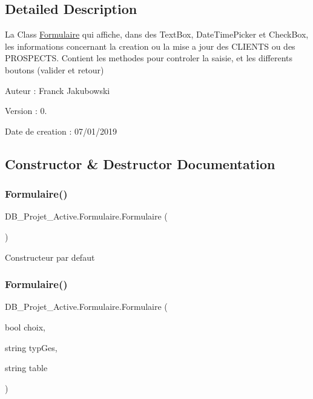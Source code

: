 \subsection{Detailed Description}
La Class \mbox{\hyperlink{class_d_b___projet___active_1_1_formulaire}{Formulaire}} qui affiche, dans des Text\+Box, Date\+Time\+Picker et Check\+Box, les informations concernant la creation ou la mise a jour des C\+L\+I\+E\+N\+TS ou des P\+R\+O\+S\+P\+E\+C\+TS. Contient les methodes pour controler la saisie, et les differents boutons (valider et retour) 

Auteur \+: Franck Jakubowski

Version \+: 0.

Date de creation \+: 07/01/2019

\subsection{Constructor \& Destructor Documentation}
\mbox{\label{class_d_b___projet___active_1_1_formulaire_aac72bda1b5ee68ba804b82fd03903d12}} 
\subsubsection{\texorpdfstring{Formulaire()}{Formulaire()}\hspace{0.1cm}{\footnotesize\ttfamily [1/3]}}
{\footnotesize\ttfamily D\+B\+\_\+\+Projet\+\_\+\+Active.\+Formulaire.\+Formulaire (\begin{DoxyParamCaption}{ }\end{DoxyParamCaption})}



Constructeur par defaut 

\mbox{\label{class_d_b___projet___active_1_1_formulaire_a8117462a103b6eb79d5cd91beb5de732}} 
\subsubsection{\texorpdfstring{Formulaire()}{Formulaire()}\hspace{0.1cm}{\footnotesize\ttfamily [2/3]}}
{\footnotesize\ttfamily D\+B\+\_\+\+Projet\+\_\+\+Active.\+Formulaire.\+Formulaire (\begin{DoxyParamCaption}\item[{bool}]{choix,  }\item[{string}]{typ\+Ges,  }\item[{string}]{table }\end{DoxyParamCaption})}



